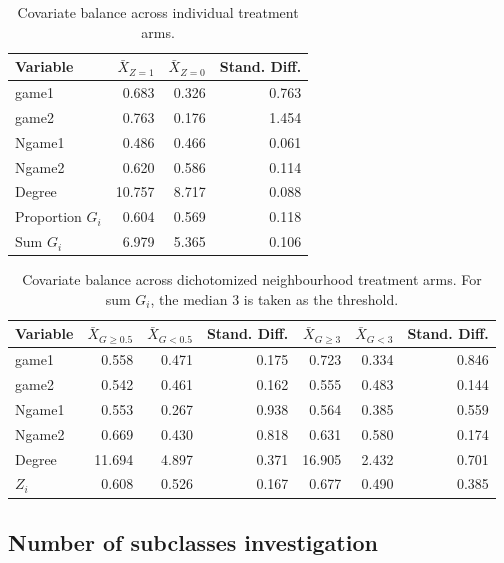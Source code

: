 \documentclass[10pt]{article}
\begin{document}
\begin{table}[H]
\centering
\begin{tabular}{@{}lrrr@{}}
\toprule
Variable & $\bar{X}_{Z=1}$ & $\bar{X}_{Z=0}$ & Stand. Diff. \\
\midrule
game1 & 0.683 & 0.326 & 0.763 \\
game2 & 0.763 & 0.176 & 1.454 \\
Ngame1 & 0.486 & 0.466 & 0.061 \\
Ngame2 & 0.620 & 0.586 & 0.114 \\
Degree & 10.757 & 8.717 & 0.088 \\
Proportion $G_i$ & 0.604 & 0.569 & 0.118 \\
Sum $G_i$ & 6.979 & 5.365 & 0.106 \\
\bottomrule
\end{tabular}
\caption{Covariate balance across individual treatment arms.}
\label{tab:indcovbal}
\end{table}

\begin{table}[H]
\centering
\begin{tabular}{@{}l@{\hskip 3em}rrr@{\hskip 3em}rrr@{}}
\toprule
Variable & $\bar{X}_{G\geq0.5}$ & $\bar{X}_{G<0.5}$ & Stand. Diff. & $\bar{X}_{G\geq3}$ & $\bar{X}_{G<3}$ & Stand. Diff. \\
\midrule
game1 & 0.558 & 0.471 & 0.175 & 0.723 & 0.334 & 0.846 \\
game2 & 0.542 & 0.461 & 0.162 & 0.555 & 0.483 & 0.144 \\
Ngame1 & 0.553 & 0.267 & 0.938 & 0.564 & 0.385 & 0.559 \\
Ngame2 & 0.669 & 0.430 & 0.818 & 0.631 & 0.580 & 0.174 \\
Degree & 11.694 & 4.897 & 0.371 & 16.905 & 2.432 & 0.701 \\
$Z_i$ & 0.608 & 0.526 & 0.167 & 0.677 & 0.490 & 0.385 \\
\bottomrule
\end{tabular}
\caption{Covariate balance across dichotomized neighbourhood treatment arms. For sum $G_i$, the median 3 is taken as the threshold.}
\label{tab:nbrcovbal}
\end{table}

\subsection{Number of subclasses investigation} \label{apx:subclass}
\end{document}
